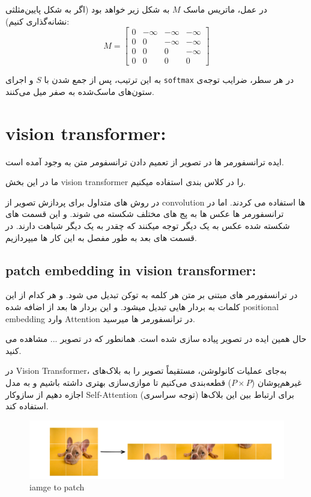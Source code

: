  در عمل، ماتریس ماسک \( M \) به شکل زیر خواهد بود (اگر به شکل پایین‌مثلثی نشانه‌گذاری کنیم):
 \[
 M =
 \begin{bmatrix}
 	0 & -\infty & -\infty & -\infty \\
 	0 & 0 & -\infty & -\infty \\
 	0 & 0 & 0 & -\infty \\
 	0 & 0 & 0 & 0
 \end{bmatrix}
 \]
 
 به این ترتیب، پس از جمع شدن با \( S \) و اجرای \texttt{softmax} در هر سطر، ضرایب توجه‌ی ستون‌های ماسک‌شده به صفر میل می‌کنند.
 
 
 
 
 \section{vision transformer:}

ایده ترانسفورمر ها در تصویر از تعمیم دادن ترانسفومر متن به وجود آمده است.

 
 ما در این بخش vision transformer را در کلاس بندی استفاده میکنیم.
 
 در روش های متداول برای پردازش تصویر از convolution  ها استفاده می کردند.
 اما در ترانسفورمر ها عکس ها به پج های مختلف شکسته می شوند.
 و این قسمت های شکسته شده عکس به یک دیگر توجه میکنند که  چقدر به یک دیگر شباهت دارند.
 در قسمت های بعد به طور مفصل به این کار ها میپردازیم.
 
 \subsection{patch embedding in vision transformer:}
 
 
 
در ترانسفورمر های مبتنی بر متن هر کلمه به توکن تبدیل می شود. و هر کدام از این کلمات به بردار هایی تبدیل میشود. و  این بردار ها بعد از اضافه شده positional embedding وارد Attention  در ترانسفورمر ها میرسید.

حال همین ایده در تصویر پیاده سازی شده است.
همانطور که در تصویر ... مشاهده  می کنید. 

 در Vision Transformer، به‌جای عملیات کانولوشن، مستقیماً تصویر را به بلاک‌های غیرهم‌پوشان ($P \times P$) قطعه‌بندی می‌کنیم تا موازی‌سازی بهتری داشته باشیم و به مدل اجازه دهیم از سازوکار Self-Attention (توجه سراسری) برای ارتباط بین این بلاک‌ها استفاده کند.




\begin{figure}[h]
	\centering
	\begin{minipage}[b]{0.9\textwidth}
		\centering
		\includegraphics[width=\textwidth]{transformer_images/image_patch_embedding.png}
		\caption{iamge to patch}
		\label{fig:image to patch in vision transformer}
	\end{minipage}
	\hfill
	
\end{figure}



